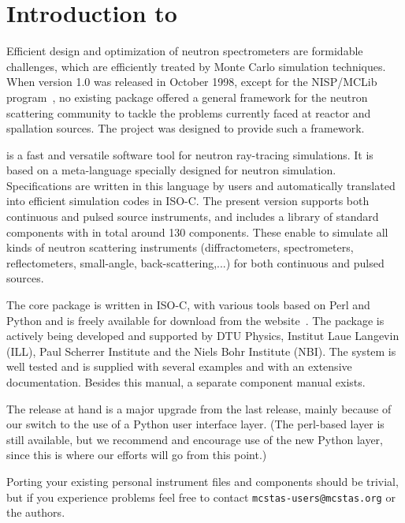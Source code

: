 
\chapter{Introduction to \MCS}

Efficient design and optimization of neutron spectrometers are
formidable challenges, which are efficiently treated by Monte Carlo
simulation techniques.
When \MCS version 1.0 was released in October
1998, except for the NISP/MCLib program~\cite{nisp_webpage}, no existing package offered a general framework for the neutron
scattering community to tackle the problems currently faced at reactor and
spallation sources. The \MCS project was designed to provide such a framework.

\MCS %
is a fast and versatile software tool for neutron ray-tracing simulations.
It is based on a meta-language specially designed for neutron
simulation. Specifications are written in this language by users and
automatically translated into efficient simulation codes in ISO-C.
The present version supports both continuous and pulsed source instruments, and includes a library of standard
components with in total around 130 components. These enable to simulate all kinds of neutron scattering instruments (diffractometers, spectrometers, reflectometers, small-angle, back-scattering,...) for both continuous and pulsed sources.

The core \MCS package is written in ISO-C, with various tools based
on Perl and Python and is freely available for download
from the \MCS website~\cite{mcstas_webpage}. The package is actively
being developed and supported by DTU Physics,
Institut Laue Langevin (ILL), Paul Scherrer Institute and the Niels
Bohr Institute (NBI).
The system is well tested and
is supplied with several examples and with an extensive documentation.
Besides this manual, a separate component manual exists.

The release at hand \MCS \version is a major upgrade from the last
release, mainly because of our switch to the use of a Python user
interface layer. (The perl-based layer is still available, but we
recommend and encourage use of the new Python layer, since this is
where our efforts will go from this point.)

Porting your existing personal instrument files and
components should be trivial, but if you experience problems feel free
to contact  \verb+mcstas-users@mcstas.org+ or the authors.

